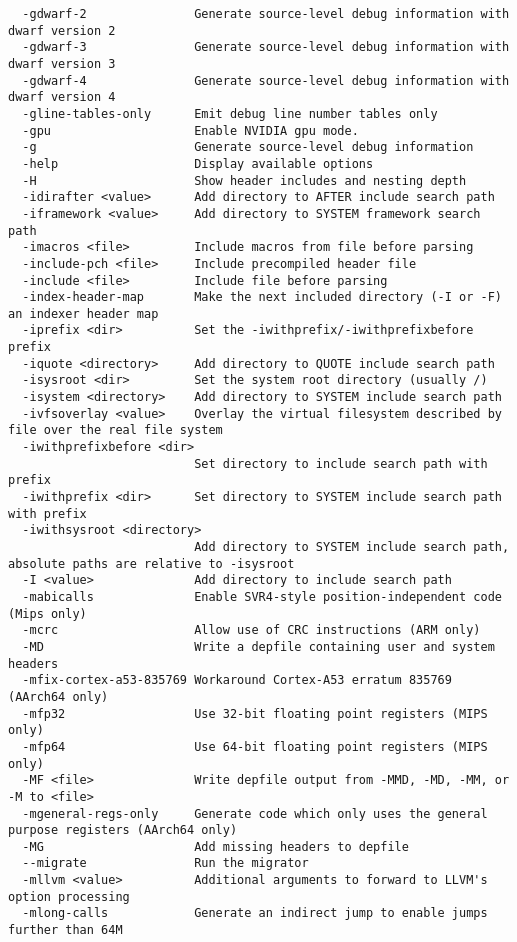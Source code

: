 \begin{verbatim}
  -gdwarf-2               Generate source-level debug information with dwarf version 2
  -gdwarf-3               Generate source-level debug information with dwarf version 3
  -gdwarf-4               Generate source-level debug information with dwarf version 4
  -gline-tables-only      Emit debug line number tables only
  -gpu                    Enable NVIDIA gpu mode.
  -g                      Generate source-level debug information
  -help                   Display available options
  -H                      Show header includes and nesting depth
  -idirafter <value>      Add directory to AFTER include search path
  -iframework <value>     Add directory to SYSTEM framework search path
  -imacros <file>         Include macros from file before parsing
  -include-pch <file>     Include precompiled header file
  -include <file>         Include file before parsing
  -index-header-map       Make the next included directory (-I or -F) an indexer header map
  -iprefix <dir>          Set the -iwithprefix/-iwithprefixbefore prefix
  -iquote <directory>     Add directory to QUOTE include search path
  -isysroot <dir>         Set the system root directory (usually /)
  -isystem <directory>    Add directory to SYSTEM include search path
  -ivfsoverlay <value>    Overlay the virtual filesystem described by file over the real file system
  -iwithprefixbefore <dir>
                          Set directory to include search path with prefix
  -iwithprefix <dir>      Set directory to SYSTEM include search path with prefix
  -iwithsysroot <directory>
                          Add directory to SYSTEM include search path, absolute paths are relative to -isysroot
  -I <value>              Add directory to include search path
  -mabicalls              Enable SVR4-style position-independent code (Mips only)
  -mcrc                   Allow use of CRC instructions (ARM only)
  -MD                     Write a depfile containing user and system headers
  -mfix-cortex-a53-835769 Workaround Cortex-A53 erratum 835769 (AArch64 only)
  -mfp32                  Use 32-bit floating point registers (MIPS only)
  -mfp64                  Use 64-bit floating point registers (MIPS only)
  -MF <file>              Write depfile output from -MMD, -MD, -MM, or -M to <file>
  -mgeneral-regs-only     Generate code which only uses the general purpose registers (AArch64 only)
  -MG                     Add missing headers to depfile
  --migrate               Run the migrator
  -mllvm <value>          Additional arguments to forward to LLVM's option processing
  -mlong-calls            Generate an indirect jump to enable jumps further than 64M

\end{verbatim}

